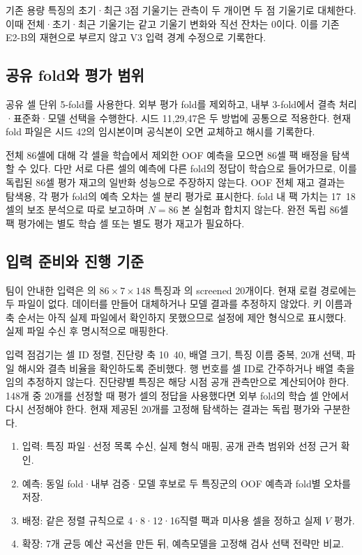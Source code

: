 기존 용량 특징의 초기·최근 3점 기울기는 관측이 두 개이면 두 점 기울기로 대체한다. 이때 전체·초기·최근 기울기는 같고 기울기 변화와 직선 잔차는 0이다. 이를 기존 E2-B의 재현으로 부르지 않고 V3 입력 경계 수정으로 기록한다.

\subsection*{공유 fold와 평가 범위}
공유 셀 단위 5-fold를 사용한다. 외부 평가 fold를 제외하고, 내부 3-fold에서 결측 처리·표준화·모델 선택을 수행한다. 시드 11,29,47은 두 방법에 공통으로 적용한다. 현재 fold 파일은 시드 42의 임시본이며 공식본이 오면 교체하고 해시를 기록한다.

전체 86셀에 대해 각 셀을 학습에서 제외한 OOF 예측을 모으면 86셀 팩 배정을 탐색할 수 있다. 다만 서로 다른 셀의 예측에 다른 fold의 정답이 학습으로 들어가므로, 이를 독립된 86셀 평가 재고의 일반화 성능으로 주장하지 않는다. OOF 전체 재고 결과는 탐색용, 각 평가 fold의 예측 오차는 셀 분리 평가로 표시한다. fold 내 팩 가치는 17~18셀의 보조 분석으로 따로 보고하며 $N=86$ 본 실험과 합치지 않는다. 완전 독립 86셀 팩 평가에는 별도 학습 셀 또는 별도 평가 재고가 필요하다.

\clearpage
\subsection*{입력 준비와 진행 기준}
팀이 안내한 입력은 의 $86\times7\times148$ 특징과 의 screened 20개이다. 현재 로컬 경로에는 두 파일이 없다. 데이터를 만들어 대체하거나 모델 결과를 추정하지 않았다. 키 이름과 축 순서는 아직 실제 파일에서 확인하지 못했으므로 설정에 제안 형식으로 표시했다. 실제 파일 수신 후 명시적으로 매핑한다.

입력 점검기는 셀 ID 정렬, 진단량 축 10~40, 배열 크기, 특징 이름 중복, 20개 선택, 파일 해시와 결측 비율을 확인하도록 준비했다. 행 번호를 셀 ID로 간주하거나 배열 축을 임의 추정하지 않는다. 진단량별 특징은 해당 시점 공개 관측만으로 계산되어야 한다. 148개 중 20개를 선정할 때 평가 셀의 정답을 사용했다면 외부 fold의 학습 셀 안에서 다시 선정해야 한다. 현재 제공된 20개를 고정해 탐색하는 결과는 독립 평가와 구분한다.

\begin{enumerate}
\item 입력: 특징 파일·선정 목록 수신, 실제 형식 매핑, 공개 관측 범위와 선정 근거 확인.
\item 예측: 동일 fold·내부 검증·모델 후보로 두 특징군의 OOF 예측과 fold별 오차를 저장.
\item 배정: 같은 정렬 규칙으로 4·8·12·16직렬 팩과 미사용 셀을 정하고 실제 $V$ 평가.
\item 확장: 7개 균등 예산 곡선을 만든 뒤, 예측모델을 고정해 검사 선택 전략만 비교.
\end{enumerate}

